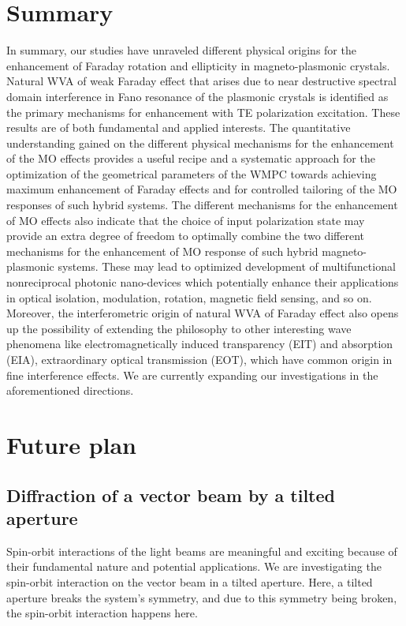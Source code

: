 \documentclass[13pt]{article}
\begin{document}
	\FloatBarrier
	\section{Summary}
	\noindent
	\par 
	In summary, our studies have unraveled different physical origins for the enhancement of Faraday rotation and ellipticity in magneto-plasmonic crystals. Natural WVA of weak Faraday effect that arises due to near destructive spectral domain interference in Fano resonance of the plasmonic crystals is identified as the primary mechanisms for enhancement with TE polarization excitation. These results are of both fundamental and applied interests. The quantitative understanding gained on the different physical mechanisms for the enhancement of the MO effects provides a useful recipe and a systematic approach for the optimization of the geometrical parameters of the WMPC towards achieving maximum enhancement of Faraday effects and for controlled tailoring of the MO responses of such hybrid systems. The different mechanisms for the enhancement of MO effects also indicate that the choice of input polarization state may provide an extra degree of freedom to optimally combine the two different mechanisms for the enhancement of MO response of such hybrid magneto-plasmonic systems. These may lead to optimized development of multifunctional nonreciprocal photonic nano-devices which potentially enhance their applications in optical isolation, modulation, rotation, magnetic field sensing, and so on. Moreover, the interferometric origin of natural WVA of Faraday effect also opens up the possibility of extending the philosophy to other interesting wave phenomena like electromagnetically induced transparency (EIT) and absorption (EIA), extraordinary optical transmission (EOT), which have common origin in fine interference effects. We are currently expanding our investigations in the aforementioned directions.
	
	\section{Future plan}
	\noindent
	\par 
	\subsection{Diffraction of a vector beam by a tilted aperture}
	\par 
	Spin-orbit interactions of the light beams are meaningful and exciting because of their fundamental nature and potential applications. We are investigating the spin-orbit interaction on the vector beam in a tilted aperture. Here, a tilted aperture breaks the system's symmetry, and due to this symmetry being broken, the spin-orbit interaction happens here.
	
\end{document}
